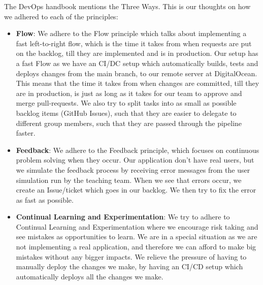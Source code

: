 The DevOps handbook \cite{kim2021devops} mentions the Three Ways. This is our thoughts on how we adhered to each of the principles:
\begin{itemize}
    \item \textbf{Flow}: We adhere to the Flow principle which talks about implementing a fast left-to-right flow, which is the time it takes from when requests are put on the backlog, till they are implemented and is in production. Our setup has a fast Flow as we have an CI/DC setup which automatically builds, tests and deploys changes from the main branch, to our remote server at DigitalOcean. This means that the time it takes from when changes are committed, till they are in production, is just as long as it takes for our team to approve and merge pull-requests. We also try to split tasks into as small as possible backlog items (GitHub Issues), such that they are easier to delegate to different group members, such that they are passed through the pipeline faster.
    \item \textbf{Feedback}: We adhere to the Feedback principle, which focuses on continuous problem solving when they occur. Our application don't have real users, but we simulate the feedback process by receiving error messages from the user simulation run by the teaching team. When we see that errors occur, we create an Issue/ticket which goes in our backlog. We then try to fix the error as fast as possible.
    \item \textbf{Continual Learning and Experimentation}: We try to adhere to Continual Learning and Experimentation where we encourage risk taking and see mistakes as opportunities to learn. We are in a special situation as we are not implementing a real application, and therefore we can afford to make big mistakes without any bigger impacts. We relieve the pressure of having to manually deploy the changes we make, by having an CI/CD setup which automatically deploys all the changes we make.
\end{itemize}

